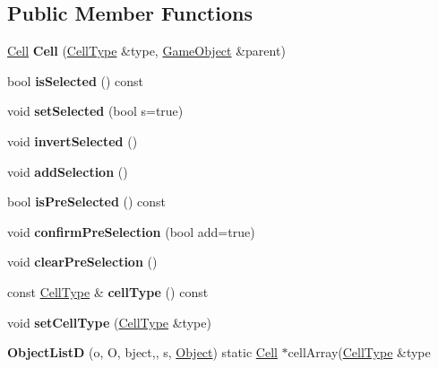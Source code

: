\subsection*{\-Public \-Member \-Functions}
\begin{DoxyCompactItemize}
\item 
\hypertarget{class_cell_a2d51e1181f3606c036965b5568fbb8ec}{\hyperlink{class_cell}{\-Cell} {\bfseries \-Cell} (\hyperlink{class_cell_type}{\-Cell\-Type} \&type, \hyperlink{class_game_object}{\-Game\-Object} \&parent)}\label{class_cell_a2d51e1181f3606c036965b5568fbb8ec}

\item 
\hypertarget{class_cell_a394830e18401f3b414c3dde4a2b4e2e8}{bool {\bfseries is\-Selected} () const }\label{class_cell_a394830e18401f3b414c3dde4a2b4e2e8}

\item 
\hypertarget{class_cell_a40146bbb2b74cf56337462abc4d0327c}{void {\bfseries set\-Selected} (bool s=true)}\label{class_cell_a40146bbb2b74cf56337462abc4d0327c}

\item 
\hypertarget{class_cell_ad8310bd5ddbdcb3ab3036356556b32b3}{void {\bfseries invert\-Selected} ()}\label{class_cell_ad8310bd5ddbdcb3ab3036356556b32b3}

\item 
\hypertarget{class_cell_a9801c2d435d44834bd14a80fba778618}{void {\bfseries add\-Selection} ()}\label{class_cell_a9801c2d435d44834bd14a80fba778618}

\item 
\hypertarget{class_cell_aa7456089022c5d2dabd4325d03007759}{bool {\bfseries is\-Pre\-Selected} () const }\label{class_cell_aa7456089022c5d2dabd4325d03007759}

\item 
\hypertarget{class_cell_a16f6d41be75c42ad20ad29d0b5725ece}{void {\bfseries confirm\-Pre\-Selection} (bool add=true)}\label{class_cell_a16f6d41be75c42ad20ad29d0b5725ece}

\item 
\hypertarget{class_cell_aa0704872b8d4ae7f40022cfebfa48944}{void {\bfseries clear\-Pre\-Selection} ()}\label{class_cell_aa0704872b8d4ae7f40022cfebfa48944}

\item 
\hypertarget{class_cell_a218280087c0d77011b0d93d3f56e1b8f}{const \hyperlink{class_cell_type}{\-Cell\-Type} \& {\bfseries cell\-Type} () const }\label{class_cell_a218280087c0d77011b0d93d3f56e1b8f}

\item 
\hypertarget{class_cell_aa7247ed72579ece05d6937de36ad5d55}{void {\bfseries set\-Cell\-Type} (\hyperlink{class_cell_type}{\-Cell\-Type} \&type)}\label{class_cell_aa7247ed72579ece05d6937de36ad5d55}

\item 
\hypertarget{class_cell_ad0fd3d547365e2f04de777f171277f45}{{\bfseries \-Object\-List\-D} (o, \-O, bject,, s, \hyperlink{class_object}{\-Object}) static \hyperlink{class_cell}{\-Cell} $\ast$cell\-Array(\hyperlink{class_cell_type}{\-Cell\-Type} \&type}\label{class_cell_ad0fd3d547365e2f04de777f171277f45}

\end{DoxyCompactItemize}
